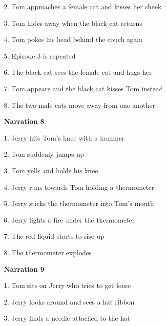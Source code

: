 \begin{appendix}
2. Tom approaches a female cat and kisses her cheek \vspace{-0.3cm}

3. Tom hides away when the black cat returns \vspace{-0.3cm}

4. Tom pokes his head behind the couch again \vspace{-0.3cm}

5. Episode 3 is repeated \vspace{-0.3cm}

6. The black cat sees the female cat and hugs her \vspace{-0.3cm}

7. Tom appears and the black cat kisses Tom instead \vspace{-0.3cm}

8. The two male cats move away from one another

\textbf{Narration 8} \vspace{-0.3cm}

1. Jerry hits Tom's knee with a hammer \vspace{-0.3cm}

2. Tom suddenly jumps up \vspace{-0.3cm}

3. Tom yells and holds his knee \vspace{-0.3cm}

4. Jerry runs towards Tom holding a thermometer \vspace{-0.3cm}

5. Jerry sticks the thermometer into Tom's mouth \vspace{-0.3cm}

6. Jerry lights a fire under the thermometer \vspace{-0.3cm}

7. The red liquid starts to rise up \vspace{-0.3cm}

8. The thermometer explodes

\textbf{Narration 9} \vspace{-0.3cm}

1. Tom sits on Jerry who tries to get loose \vspace{-0.3cm}

2. Jerry looks around and sees a hat ribbon\vspace{-0.3cm}

3. Jerry finds a needle attached to the hat \vspace{-0.3cm}


\end{appendix}
